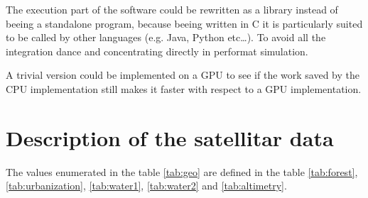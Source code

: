 \documentclass[Lau]{sapthesis} %
\begin{document}
The execution part of the software could be rewritten as a library instead of
beeing a standalone program, because beeing written in C it is particularly
suited to be called by other languages (e.g. Java, Python etc\dots). To avoid
all the integration dance and concentrating directly in performat simulation.

A trivial version could be implemented on a GPU to see if the work saved by the
CPU implementation still makes it faster with respect to a GPU implementation.

\appendix

\section{Description of the satellitar data}\label{sec:desc}

The values enumerated in the table \ref{tab:geo} are defined in the table
\ref{tab:forest}, \ref{tab:urbanization}, \ref{tab:water1}, \ref{tab:water2} and
\ref{tab:altimetry}.
\end{document}
